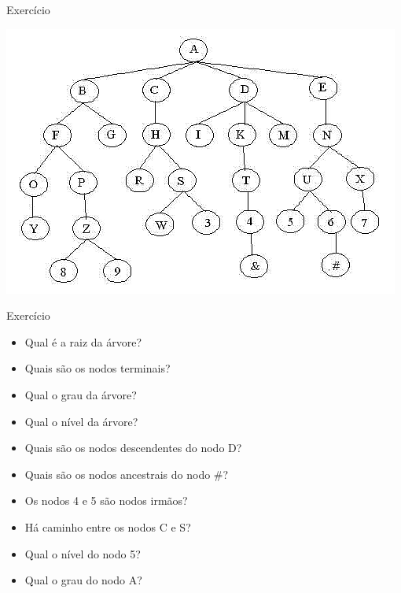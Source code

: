 \documentclass[12pt,table,xcolor={dvipsnames}]{beamer}
\begin{document}
\begin{frame}[fragile]{Exercício}
          \begin{center}
          \includegraphics[scale=.55]{exercicio.png} 
          \end{center}
\end{frame} 



\begin{frame}[fragile]{Exercício}
          \begin{itemize}
          \item Qual é a raiz da árvore?
          \item Quais são os nodos terminais?
          \item Qual o grau da árvore?
          \item Qual o nível da árvore?
          \item Quais são os nodos descendentes do nodo D?
          \item Quais são os nodos ancestrais do nodo \#?
          \item Os nodos 4 e 5 são nodos irmãos?
          \item Há caminho entre os nodos C e S?
          \item Qual o nível do nodo 5?
          \item Qual o grau do nodo A?
          \end{itemize}
\end{frame} 
\end{document}
